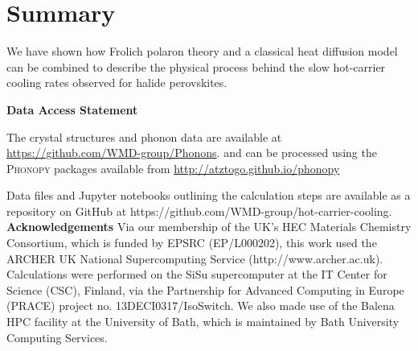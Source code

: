 %

\section{Summary}

We have shown how Fr{\:o}lich polaron theory and a classical heat diffusion model can be combined to
describe the physical process behind the slow hot-carrier cooling rates
observed for halide perovskites.

\textbf{Data Access Statement}

The crystal structures and phonon data are available at \url{https://github.com/WMD-group/Phonons}. 
and can be processed using the \textsc{Phonopy} packages available from \url{http://atztogo.github.io/phonopy} 

Data files and Jupyter notebooks outlining the calculation steps are available as a repository on GitHub at https://github.com/WMD-group/hot-carrier-cooling.
\textbf{Acknowledgements}
Via our membership of the UK's HEC Materials Chemistry Consortium, which is funded by EPSRC (EP/L000202), this work used the ARCHER UK National Supercomputing Service (http://www.archer.ac.uk).
Calculations were performed on the SiSu supercomputer at the IT Center for Science (CSC), Finland, via the Partnership for Advanced Computing in Europe (PRACE) project no. 13DECI0317/IsoSwitch. We also made use of the Balena HPC facility at the University of Bath, which is maintained by Bath University Computing Services.


